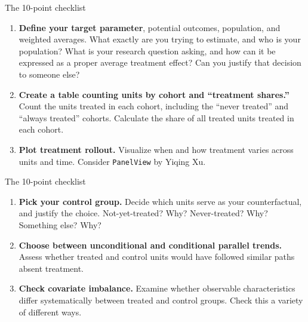 \documentclass[aspectratio=169,11pt]{beamer}
\begin{document}
\begin{frame}[t]{The 10-point checklist}
\vspace{0.8em}
\begin{enumerate}\setlength\itemsep{\fill}
  \item[1.] \textbf{Define your target parameter}, potential outcomes, population, and weighted averages. What exactly are you trying to estimate, and who is your population? What is your research question asking, and how can it be expressed as a proper average treatment effect? Can you justify that decision to someone else?
  \item[2.] \textbf{Create a table counting units by cohort and ``treatment shares.''} Count the units treated in each cohort, including the ``never treated'' and ``always treated'' cohorts. Calculate the share of all treated units treated in each cohort.
  \item[3.] \textbf{Plot treatment rollout.} Visualize when and how treatment varies across units and time. Consider \texttt{PanelView} by Yiqing Xu.
\end{enumerate}
\vspace*{\fill}
\end{frame}

\begin{frame}[t]{The 10-point checklist}
\vspace{0.8em}
\begin{enumerate}\setlength\itemsep{\fill}
  \item[4.] \textbf{Pick your control group.} Decide which units serve as your counterfactual, and justify the choice. Not-yet-treated? Why? Never-treated? Why? Something else? Why?
  \item[5.] \textbf{Choose between unconditional and conditional parallel trends.} Assess whether treated and control units would have followed similar paths absent treatment.
  \item[6.] \textbf{Check covariate imbalance.} Examine whether observable characteristics differ systematically between treated and control groups. Check this a variety of different ways.
\end{enumerate}
\vspace*{\fill}
\end{frame}
\end{document}
